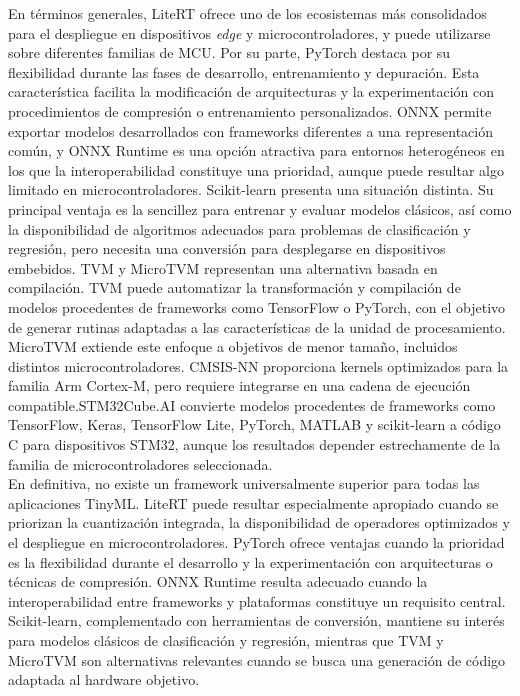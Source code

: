 \documentclass[a4paper,12pt,twoside,final]{book}
\begin{document}
En términos generales, LiteRT ofrece uno de los ecosistemas más consolidados para el despliegue en dispositivos
\textit{edge} y microcontroladores, y puede utilizarse sobre diferentes familias de MCU. Por su parte, PyTorch
destaca por su flexibilidad durante las fases de desarrollo, entrenamiento y depuración. Esta característica
facilita la modificación de arquitecturas y la experimentación con procedimientos de compresión o entrenamiento
personalizados. ONNX permite exportar modelos desarrollados con frameworks diferentes
a una representación común, y ONNX Runtime es una opción atractiva para entornos heterogéneos en los que la
interoperabilidad constituye una prioridad, aunque puede resultar algo limitado en microcontroladores. Scikit-learn
presenta una situación distinta. Su principal ventaja es la sencillez para entrenar y evaluar modelos clásicos, así
como la disponibilidad de algoritmos adecuados para problemas de clasificación y regresión, pero necesita una
conversión para desplegarse en dispositivos embebidos. TVM y MicroTVM representan una alternativa basada en
compilación. TVM puede automatizar la transformación y compilación de modelos procedentes de frameworks como
TensorFlow o PyTorch, con el objetivo de generar rutinas adaptadas a las características de la unidad de
procesamiento. MicroTVM extiende este enfoque a objetivos de menor tamaño, incluidos distintos microcontroladores.
CMSIS-NN proporciona kernels optimizados para la familia Arm Cortex-M, pero requiere integrarse en una cadena de
ejecución compatible.STM32Cube.AI convierte modelos procedentes de frameworks como TensorFlow, Keras, TensorFlow
Lite, PyTorch, MATLAB y scikit-learn a código C para dispositivos STM32, aunque los resultados depender
estrechamente de la familia de microcontroladores seleccionada.\\

En definitiva, no existe un framework universalmente superior para todas las aplicaciones TinyML. LiteRT puede
resultar especialmente apropiado cuando se priorizan la cuantización integrada, la disponibilidad de operadores
optimizados y el despliegue en microcontroladores. PyTorch ofrece ventajas cuando la prioridad es la flexibilidad
durante el desarrollo y la experimentación con arquitecturas o técnicas de compresión. ONNX Runtime resulta adecuado
cuando la interoperabilidad entre frameworks y plataformas constituye un requisito central. Scikit-learn,
complementado con herramientas de conversión, mantiene su interés para modelos clásicos de clasificación y
regresión, mientras que TVM y MicroTVM son alternativas relevantes cuando se busca una generación de código adaptada
al hardware objetivo.\\
\end{document}
